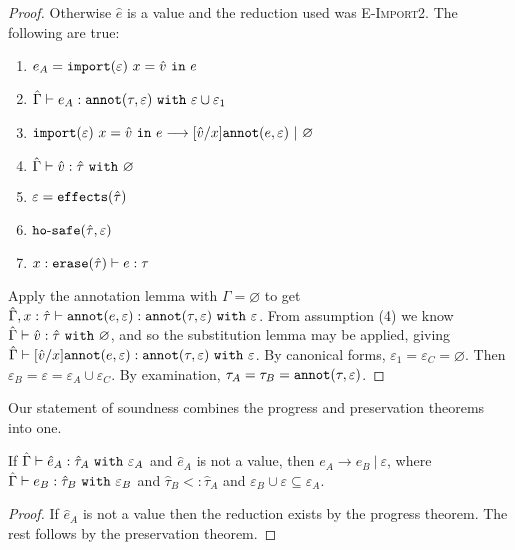 \begin{proof}
Otherwise $\hat e$ is a value and the reduction used was \textsc{E-Import2}. The following are true:
\begin{enumerate}
	\setlength\itemsep{-0.7em}
	\item $e_A = \mathtt{import}(\varepsilon)~x = \hat v~\mathtt{in}~ e$
	\item $\hat \Gamma \vdash e_A: \mathtt{annot}(\tau, \varepsilon)~\mathtt{with}~ \varepsilon \cup \varepsilon_1$
	\item $\mathtt{import}(\varepsilon)~x = \hat v~\mathtt{in}~ e \longrightarrow [\hat v/x]\mathtt{annot}(e, \varepsilon)~|~\varnothing$
	\item $\hat \Gamma \vdash \hat v: \hat \tau~\mathtt{with}~ \varnothing$
	\item $\varepsilon = \mathtt{effects}(\hat \tau)$
	\item $\mathtt{ho \hbox{-} safe}(\hat \tau, \varepsilon)$
	\item $x: \mathtt{erase}(\hat \tau) \vdash e: \tau$
\end{enumerate}

\noindent
Apply the annotation lemma with $\Gamma = \varnothing$ to get $\hat \Gamma, x: \hat \tau \vdash \mathtt{annot}(e, \varepsilon): \mathtt{annot}(\tau, \varepsilon)~\mathtt{with}~ \varepsilon$. From assumption (4) we know $\hat \Gamma \vdash \hat v: \hat \tau~\mathtt{with}~ \varnothing$, and so the substitution lemma may be applied, giving $\hat \Gamma \vdash [\hat v/x]\mathtt{annot}(e, \varepsilon): \mathtt{annot}(\tau, \varepsilon)~\mathtt{with}~ \varepsilon$. By canonical forms, $\varepsilon_1 = \varepsilon_C = \varnothing$. Then $\varepsilon_B = \varepsilon = \varepsilon_A \cup \varepsilon_C$. By examination, $\tau_A = \tau_B = \mathtt{annot}(\tau, \varepsilon)$.
\end{proof}

\noindent
Our statement of soundness combines the progress and preservation theorems into one.

\begin{theorem}[Soundness]
If $\hat \Gamma \vdash \hat e_A: \hat \tau_A~\mathtt{with}~ \varepsilon_A$ and $\hat e_A$ is not a value, then $e_A \longrightarrow e_B~|~\varepsilon$, where $\hat \Gamma \vdash e_B: \hat \tau_B~\mathtt{with}~ \varepsilon_B$ and $\hat \tau_B <: \hat \tau_A$ and $\varepsilon_B \cup \varepsilon \subseteq \varepsilon_A$.
\end{theorem}
\begin{proof}
If $\hat e_A$ is not a value then the reduction exists by the progress theorem. The rest follows by the preservation theorem.
\end{proof}


